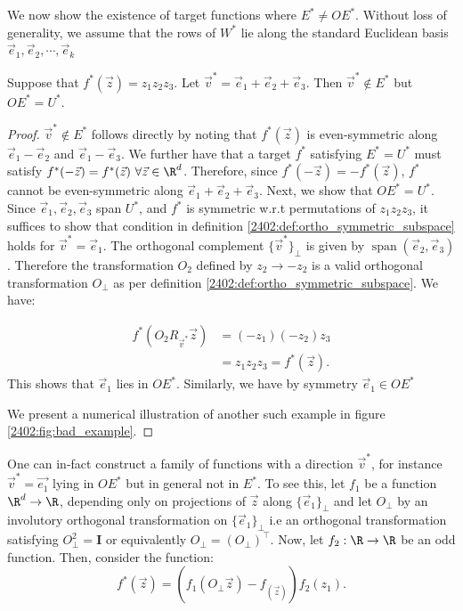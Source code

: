 We now show the existence of target functions where $E^* \neq OE^*$. Without loss of generality, we assume that the rows of $W^*$ lie along the standard Euclidean basis $\vec{e}_1, \vec{e}_2,\cdots, \vec{e}_k$
\begin{lemma}
    Suppose that $f^*(\vec{z}) = z_1z_2z_3$. Let $\vec{v}^* = \vec{e}_1+\vec{e}_2+\vec{e}_3$. Then $\vec{v}^* \notin E^*$ but $OE^*=U^*$.
\end{lemma}
\begin{proof}
    $\vec{v}^* \notin E^*$ follows directly by noting that $f^*(\vec{z})$ is even-symmetric along $\vec{e}_1-\vec{e}_2$ and $\vec{e}_1-\vec{e}_3$. We further have that a target $f^*$ satisfying $E^*=U^*$ must satisfy $f^*(-\vec{z}) = f^*(\vec{z}) \ \forall \vec{z} \in \R^d$. Therefore, since $f^*(-\vec{z}) = -f^*(\vec{z})$, $f^*$ cannot be even-symmetric along $\vec{e}_1+\vec{e}_2+\vec{e}_3$. 
    Next, we show that $OE^*=U^*$. Since $\vec{e}_1, \vec{e}_2, \vec{e}_3$ span $U^*$, and $f^*$ is symmetric w.r.t permutations of $z_1z_2z_3$, it suffices to show that condition in definition \ref{2402:def:ortho_symmetric_subspace} holds for $\vec{v}^* = \vec{e}_1$. The orthogonal complement $\{\vec{v}^*\}_\perp$ is given by $\operatorname{span}(\vec{e}_2,\vec{e}_3)$. Therefore the transformation $O_2$ defined by $z_2 \rightarrow -z_2$ is a valid orthogonal transformation $O_\perp$ as per definition \ref{2402:def:ortho_symmetric_subspace}. We have:

\begin{align*}
    f^*(O_2 R_{\vec{v}^*}\vec{z}) &= (-z_1)(-z_2)z_3\\
    &= z_1z_2z_3 = f^*(\vec{z}).
\end{align*}
This shows that $\vec{e}_1$ lies in $OE^*$. Similarly, we have by symmetry $\vec{e}_1 \in OE^*$

We present a numerical illustration of another such example in figure \ref{2402:fig:bad_example}.
\end{proof}

One can in-fact construct a family of functions with a direction $\vec{v}^*$, for instance $\vec{v}^* = \vec{e_1}$ lying in $OE^*$ but in general not in $E^*$. To see this, let $f_1$ be a function $\R^d \rightarrow \R$, depending only on projections of $\vec{z}$ along $\{\vec{e}_1\}_\perp$ and let $O_\perp$ by an involutory orthogonal transformation on $\{\vec{e}_1\}_\perp$ i.e an orthogonal transformation satisfying $O^2_\perp = \mathbf{I}$ or equivalently $O_\perp = (O_\perp)^\top$. Now, let $f_2:\R \rightarrow \R$ be an odd function. Then, consider the function:
\begin{equation}
    f^*(\vec{z}) = (f_1(O_\perp \vec{z})-f_(\vec{z}))f_2(z_1).
\end{equation}


